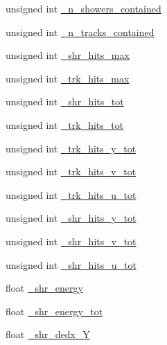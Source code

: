 \begin{DoxyCompactItemize}
\item 
unsigned int \hyperlink{classselection_1_1CC0piNpSelection_aebf4a69b8d7f3171ad90c382668c22ec}{\-\_\-n\-\_\-showers\-\_\-contained}
\item 
unsigned int \hyperlink{classselection_1_1CC0piNpSelection_a22c5cd4cf8882fa3cbabf25ed86d1f39}{\-\_\-n\-\_\-tracks\-\_\-contained}
\item 
unsigned int \hyperlink{classselection_1_1CC0piNpSelection_a750834ef52299d85f9596bbbafa1dffb}{\-\_\-shr\-\_\-hits\-\_\-max}
\item 
unsigned int \hyperlink{classselection_1_1CC0piNpSelection_a247d186cb641d28f8ea5b02c4f2a39bc}{\-\_\-trk\-\_\-hits\-\_\-max}
\item 
unsigned int \hyperlink{classselection_1_1CC0piNpSelection_aa6e7162371e3e343df001f0afc8a20b8}{\-\_\-shr\-\_\-hits\-\_\-tot}
\item 
unsigned int \hyperlink{classselection_1_1CC0piNpSelection_a420b9962478d7998282e03f1ccf89c2e}{\-\_\-trk\-\_\-hits\-\_\-tot}
\item 
unsigned int \hyperlink{classselection_1_1CC0piNpSelection_a76eb07fcb9190709464880c0ea7c4eba}{\-\_\-trk\-\_\-hits\-\_\-y\-\_\-tot}
\item 
unsigned int \hyperlink{classselection_1_1CC0piNpSelection_a30fe5ccb6a299f7955125aa6c9d5923d}{\-\_\-trk\-\_\-hits\-\_\-v\-\_\-tot}
\item 
unsigned int \hyperlink{classselection_1_1CC0piNpSelection_af7d0e867df8901ff3e531b4c1b96408a}{\-\_\-trk\-\_\-hits\-\_\-u\-\_\-tot}
\item 
unsigned int \hyperlink{classselection_1_1CC0piNpSelection_a6a43c3523af47860ad1682ebe14bb8e3}{\-\_\-shr\-\_\-hits\-\_\-y\-\_\-tot}
\item 
unsigned int \hyperlink{classselection_1_1CC0piNpSelection_ab6aaf4282fa9d2e5971e162c66901227}{\-\_\-shr\-\_\-hits\-\_\-v\-\_\-tot}
\item 
unsigned int \hyperlink{classselection_1_1CC0piNpSelection_afba4a31f84c2f125323b90f007bda1c6}{\-\_\-shr\-\_\-hits\-\_\-u\-\_\-tot}
\item 
float \hyperlink{classselection_1_1CC0piNpSelection_abf854f061d0476dc08ae8b3d71e7a86d}{\-\_\-shr\-\_\-energy}
\item 
float \hyperlink{classselection_1_1CC0piNpSelection_a6e42f011e79f646f36df7148907d1b59}{\-\_\-shr\-\_\-energy\-\_\-tot}
\item 
float \hyperlink{classselection_1_1CC0piNpSelection_a1af96c31bd3afe4b111f429927bbff1c}{\-\_\-shr\-\_\-dedx\-\_\-\-Y}
\item 

\end{DoxyCompactItemize}
